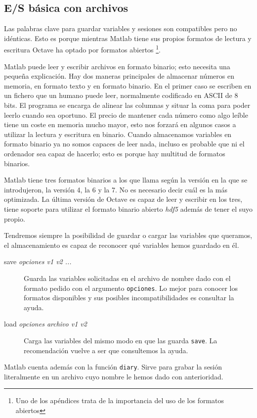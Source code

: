 \subsection{E/S básica con archivos}

Las palabras clave para guardar variables y sesiones son compatibles
pero no idénticas. Esto es porque mientras Matlab tiene sus propios
formatos de lectura y escritura Octave ha optado por formatos
abiertos%
\footnote{Uno de los apéndices trata de la importancia del uso de los
  formatos abiertos%
}.

Matlab puede leer y escribir archivos en formato binario; esto
necesita una pequeña explicación. Hay dos maneras principales de
almacenar números en memoria, en formato texto y en formato binario.
En el primer caso se escriben en un fichero que un humano puede leer,
normalmente codificado en ASCII de 8 bits. El programa se encarga de
alinear las columnas y situar la coma para poder leerlo cuando sea
oportuno. El precio de mantener cada número como algo leíble tiene un
coste en memoria mucho mayor, esto nos forzará en algunos casos a
utilizar la lectura y escritura en binario. Cuando almacenamos
variables en formato binario ya no somos capaces de leer nada, incluso
es probable que ni el ordenador sea capaz de hacerlo; esto es porque
hay multitud de formatos binarios.

Matlab tiene tres formatos binarios a los que llama según la versión
en la que se introdujeron, la versión 4, la 6 y la 7. No es necesario
decir cuál es la más optimizada. La última versión de Octave es capaz
de leer y escribir en los tres, tiene soporte para utilizar el formato
binario abierto \emph{hdf5} además de tener el suyo propio.

Tendremos siempre la posibilidad de guardar o cargar las variables que
queramos, el almacenamiento es capaz de reconocer qué variables hemos
guardado en él.

\begin{description}
\item [{save \textsl{opciones v1 v2 ...}}]Guarda las
  variables solicitadas en el archivo de nombre dado con el formato
  pedido con el argumento \texttt{opciones}. Lo mejor para conocer los
  formatos disponibles y sus posibles incompatibilidades es consultar
  la ayuda.
\item [{load \textsl{opciones archivo v1 v2}}]Carga las
  variables del mismo modo en que las guarda \texttt{save}. La
  recomendación vuelve a ser que consultemos la ayuda.
\end{description}
Matlab cuenta además con la función \texttt{diary}. Sirve para grabar
la sesión literalmente en un archivo cuyo nombre le hemos dado con
anterioridad.

